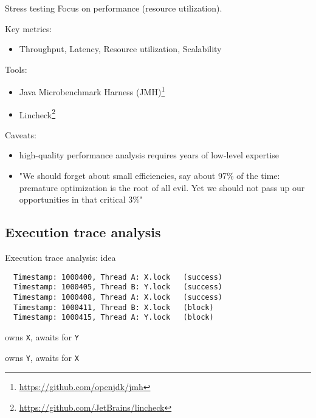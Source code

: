 \begin{frame}[t,noframenumbering]{Stress testing}
Focus on performance (resource utilization).

Key metrics:
\begin{itemize}
  \item Throughput, Latency, Resource utilization, Scalability
\end{itemize}

\pause
Tools:
\begin{itemize}
  \item Java Microbenchmark Harness (JMH)\footnote<2->{\tiny\url{https://github.com/openjdk/jmh}}
  \item Lincheck\footnote<2->{\tiny\url{https://github.com/JetBrains/lincheck}}
\end{itemize}

\pause
Caveats: 
\begin{itemize}
  \item high-quality performance analysis requires years of low-level expertise
  \item "We should forget about small efficiencies, say about 97\% of the time: premature optimization is the root of all evil. Yet we should not pass up our opportunities in that critical 3\%"
\end{itemize}
\end{frame}


\subsection{Execution trace analysis}
\showTOCSub

\begin{frame}[fragile]{Execution trace analysis: idea}

\begin{verbatim}
  Timestamp: 1000400, Thread A: X.lock   (success)
  Timestamp: 1000405, Thread B: Y.lock   (success)
  Timestamp: 1000408, Thread A: X.lock   (success)
  Timestamp: 1000411, Thread B: X.lock   (block)
  Timestamp: 1000415, Thread A: Y.lock   (block)
\end{verbatim}

\pause

 owns \texttt{X}, awaits for \texttt{Y}

 owns \texttt{Y}, awaits for \texttt{X}

\end{frame}



